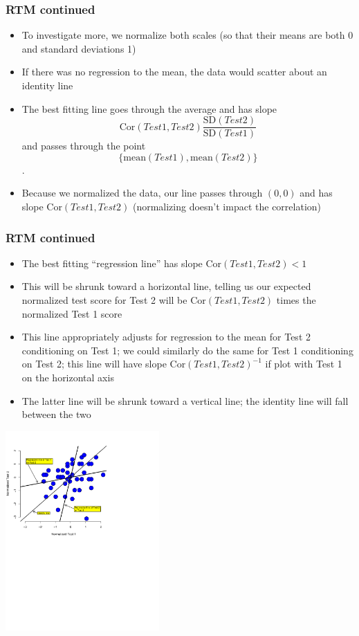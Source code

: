 \documentclass[aspectratio=169]{beamer}
\newcommand{\Cor}{\mathrm{Cor}}
\begin{document}
\begin{frame}\frametitle{RTM continued}
  \begin{itemize}
     \item To investigate more, we normalize both scales (so that their
       means are both 0 and standard deviations 1)
     \item If there was no regression to the mean, the data would
       scatter about an identity line
     \item The best fitting line goes through the average and has slope 
       $$\Cor(Test1, Test2) \frac{\mathrm{SD}(Test2)}{\mathrm{SD}(Test1)}$$
       and passes 
       through the point $$\{\mathrm{mean}(Test1),\mathrm{mean}(Test 2)\}$$.
     \item Because we normalized the data, our line passes through $(0, 0)$ and 
       has slope $\Cor(Test1, Test2)$ (normalizing doesn't impact the correlation)
  \end{itemize}
\end{frame}

\begin{frame}\frametitle{RTM continued}
  \begin{itemize}
    \item The best fitting ``regression line'' has slope $\Cor(Test1, Test2)<1$
    \item This will be shrunk toward a horizontal line, telling us our
      expected normalized test score for Test 2 will be $\Cor(Test1, Test2)$
      times the normalized Test 1 score
    \item This line appropriately adjusts for regression to the mean for
      Test 2 conditioning on Test 1; we could similarly do the same for
      Test 1 conditioning on Test 2; this line will have slope $\Cor(Test1, Test2)^{-1}$
      if plot with Test 1 on the horizontal axis
    \item The latter line will be shrunk toward a vertical line; the
      identity line will fall between the two
  \end{itemize}
\end{frame}

\begin{frame}
  \begin{center}
    \includegraphics[height=3in]{rtm2Anotated.pdf}    
  \end{center}
\end{frame}
\end{document}
